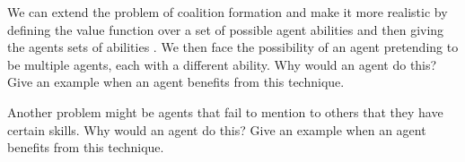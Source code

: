 \begin{exercises}
\item We can extend the problem of coalition formation and make it
  more realistic by defining the value function over a set of possible
  agent abilities and then giving the agents sets of abilities
  \cite{yokoo05a}. We then face the possibility of an agent pretending
  to be multiple agents, each with a different ability. Why would an
  agent do this? Give an example when an agent benefits from this
  technique.

  Another problem might be agents that fail to mention to others that
  they have certain skills. Why would an agent do this? Give an
  example when an agent benefits from this technique.


\end{exercises}




